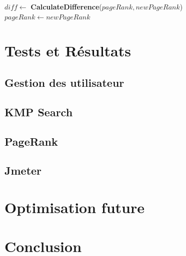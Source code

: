 \documentclass[11pt,english]{article}
\begin{document}
{\begin{algorithm}[H]
{            %
            $diff \gets$ \textbf{CalculateDifference}($pageRank, newPageRank$)\;
            $pageRank \gets newPageRank$\;
        }
        \;
    \end{algorithm}
        
        

    \section{Tests et Résultats}

    \subsection{Gestion des utilisateur}

    \subsection{KMP Search}

    \subsection{PageRank}

    \subsection{Jmeter}

    \section{Optimisation future}

    \section{Conclusion}
}
\end{document}
